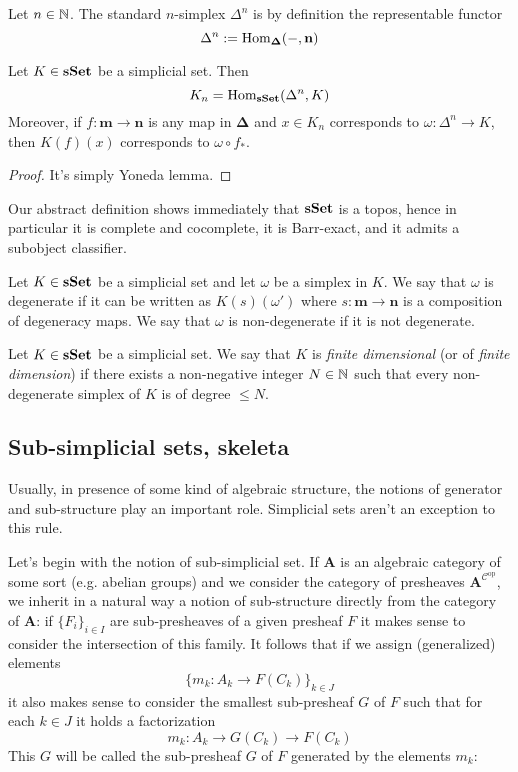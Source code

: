 \begin{refsection}
\begin{defin}
Let $n \in \mathbb{N}$. The standard $n$-simplex $\Delta^n$ is by definition the representable functor
\[
\Delta^n := \mathrm{Hom}_{\mathbf \Delta}(-,\mathbf n)
\]
\end{defin}

\begin{prop} \label{prop simplicial morphisms with Yoneda identification}
Let $K \in \mathbf{sSet}$ be a simplicial set. Then
\[
K_n = \mathrm{Hom}_{\mathbf{sSet}}(\Delta^n,K)
\]
Moreover, if $f \colon \mathbf m \to \mathbf n$ is any map in $\mathbf \Delta$ and $x \in K_n$ corresponds to $\omega \colon \Delta^n \to K$, then $K(f)(x)$ corresponds to $\omega \circ f_*$.
\end{prop}

\begin{proof}
It's simply Yoneda lemma.
\end{proof}

Our abstract definition shows immediately that $\mathbf{sSet}$ is a topos, hence in particular it is complete and cocomplete, it is Barr-exact, and it admits a subobject classifier. 

\begin{defin}
Let $K \in \mathbf{sSet}$ be a simplicial set and let $\omega$ be a simplex in $K$. We say that $\omega$ is degenerate if it can be written as $K(s)(\omega')$ where $s \colon \mathbf m \to \mathbf n$ is a composition of degeneracy maps. We say that $\omega$ is non-degenerate if it is not degenerate.
\end{defin}

\begin{defin} \label{def simplicial set of finite dimension}
Let $K \in \mathbf{sSet}$ be a simplicial set. We say that $K$ is \emph{finite dimensional} (or of \emph{finite dimension}) if there exists a non-negative integer $N \in \mathbb{N}$ such that every non-degenerate simplex of $K$ is of degree $\le N$.
\end{defin}

\subsection{Sub-simplicial sets, skeleta}

Usually, in presence of some kind of algebraic structure, the notions of generator and sub-structure play an important role. Simplicial sets aren't an exception to this rule.

Let's begin with the notion of sub-simplicial set. If $\mathbf A$ is an algebraic category of some sort (e.g. abelian groups) and we consider the category of presheaves $\mathbf A^{\mathcal C^\mathrm{op}}$, we inherit in a natural way a notion of sub-structure directly from the category of $\mathbf A$: if $\{F_i\}_{i \in I}$ are sub-presheaves of a given presheaf $F$ it makes sense to consider the intersection of this family. It follows that if we assign (generalized) elements
\[
\{m_k \colon A_k \to F(C_k)\}_{k \in J}
\]
it also makes sense to consider the smallest sub-presheaf $G$ of $F$ such that for each $k \in J$ it holds a factorization
\[
m_k \colon A_k \to G(C_k) \to F(C_k)
\]
This $G$ will be called the sub-presheaf $G$ of $F$ generated by the elements $m_k$:


\end{refsection}

